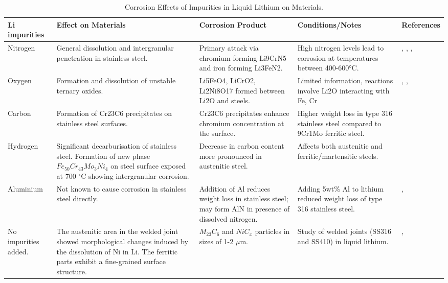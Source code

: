 \begin{table}[h!]
	\begin{tabular}{p{2cm}p{3cm}p{3.5cm}p{3.5cm}p{2cm}}
		\rule[-0.3cm]{0pt}{0.8cm} \textbf{Li impurities} & \textbf{Effect on Materials} & \textbf{Corrosion Product} & \textbf{Conditions/Notes} & \textbf{References} \\ \hline
		\rule[-0.3cm]{0pt}{0.8cm} Nitrogen & General dissolution and intergranular penetration in stainless steel. & Primary attack via chromium forming Li9CrN5 and iron forming Li3FeN2. & High nitrogen levels lead to corrosion at temperatures between 400-600°C. & \cite{Keough1985}, \cite{Chopra1988}, \cite{Muroga2008}, \cite{Heinzel2006} \\ \hline
		\rule[-0.3cm]{0pt}{0.8cm} Oxygen & Formation and dissolution of unstable ternary oxides. & Li5FeO4, LiCrO2, Li2Ni8O17 formed between Li2O and steels. & Limited information, reactions involve Li2O interacting with Fe, Cr & \cite{IAEA2020}, \cite{Finn1981}, \cite{PULHAM1984} \\ \hline
		\rule[-0.3cm]{0pt}{0.8cm} Carbon & Formation of Cr23C6 precipitates on stainless steel surfaces. & Cr23C6 precipitates enhance chromium concentration at the surface. & Higher weight loss in type 316 stainless steel compared to 9Cr1Mo ferritic steel. & \cite{Parida2019} \\ \hline
		\rule[-0.3cm]{0pt}{0.8cm} Hydrogen & Significant decarburisation of stainless steel. Formation of new phase $Fe_{50}Cr_{43}Mo_{3}Ni_{4}$ on steel surface exposed at 700 $^\circ$C showing intergranular corrosion. & Decrease in carbon content more pronounced in austenitic steel. & Affects both austenitic and ferritic/martensitic steels. & \cite{Parida2019} \cite{Xia2019} \\ \hline
		\rule[-0.3cm]{0pt}{0.8cm} Aluminium & Not known to cause corrosion in stainless steel directly. & Addition of Al reduces weight loss in stainless steel; may form AlN in presence of dissolved nitrogen. & Adding 5wt\% Al to lithium reduced weight loss of type 316 stainless steel. & \cite{Tortorelli1980}, \cite{Keough1985} \\ \hline
		\rule[-0.3cm]{0pt}{0.8cm} No impurities added. & The austenitic area in the welded joint showed morphological changes induced by the dissolution of Ni in Li. The ferritic parts exhibit a fine-grained surface structure. & $M_{23}C_{6}$ and $NiC_x$ particles in sizes of 1-2 $\mu$m. & Study of welded joints (SS316 and SS410) in liquid lithium. & \cite{Xia2019}, \cite{Tsisar2019} \\ \hline
		
	\end{tabular}
	\captionsetup{font=bf, size=small}
	\caption{Corrosion Effects of Impurities in Liquid Lithium on Materials.}
	\label{corrosion_effects}
\end{table}


